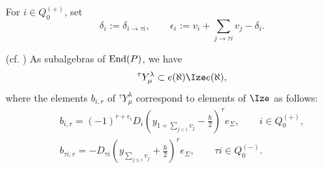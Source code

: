 For \(i\in Q_0^{(+)}\), set
\[
\delta_i:=\delta_{i\to\tau i},
\qquad
\epsilon_i:=
v_i+\sum_{j\to\tau i}v_j-\delta_i.
\]
\begin{theorem} (cf. \cite[Thm. 4.22]{KTWWY19})
\label{lambsh}
As subalgebras of $\operatorname{End}(P)$, we have \[\trust\subset e(\aleph)\tR e(\aleph),\] where
    the elements $b_{i,r}$ of ${}^\tau Y_\mu^{\lambda}$ correspond to elements of $\tR$ as follows:
    \begin{gather}
\label{biimage}
b_{i,r}
=
(-1)^{r+\epsilon_i}
D_i
\left(
y_{1+\sum_{j<i}v_j}-\frac{\hbar}{2}
\right)^r
e_\Sigma,
\qquad i\in Q_0^{(+)},
\\
\label{btiimage}
b_{\tau i,r}
=
-
D_{\tau i}
\left(
y_{\sum_{j\leq i}v_j}+\frac{\hbar}{2}
\right)^r
e_\Sigma,
\qquad \tau i\in Q_0^{(-)}.
\end{gather}
\end{theorem}
